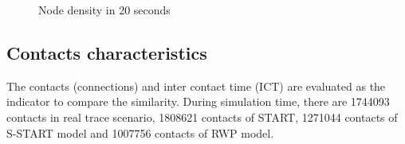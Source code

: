 \begin{figure}[htbp]
\centering
{}
\caption{Node density in 20 seconds}\label{figure_node_distribution}
\end{figure}


\subsection{Contacts characteristics}

The contacts (connections) and inter contact time (ICT) \cite{vHuWang-23} are evaluated as the indicator to compare the similarity.
During simulation time, there are 1744093 contacts in real trace scenario, 1808621 contacts of START, 1271044 contacts of S-START model and 1007756 contacts of RWP model.

